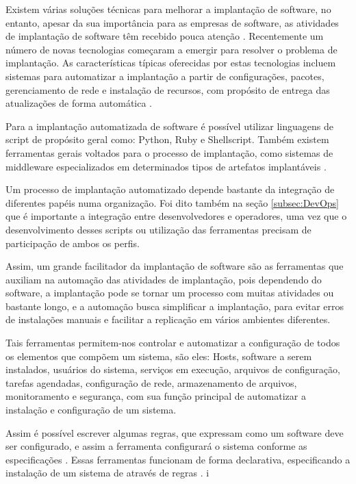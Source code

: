 Existem várias soluções técnicas para melhorar a implantação de software,
no entanto, apesar da sua importância para as empresas de software, as atividades
de implantação de software têm recebido pouca atenção \cite{5741269}. Recentemente 
um número de novas tecnologias começaram a emergir para
resolver o problema de implantação. As características típicas oferecidas por
estas tecnologias incluem sistemas para automatizar a implantação a partir de
configurações, pacotes, gerenciamento de rede e instalação de recursos, com
propósito de entrega das atualizações de forma automática \cite{deployment1998}.

Para a implantação automatizada de software é
possível utilizar linguagens de script de propósito
geral como: Python, Ruby e Shellscript. Também existem ferramentas gerais 
voltados para o processo de implantação, como sistemas de middleware 
especializados em determinados tipos de artefatos implantáveis \cite{leo2014}.

Um processo de implantação automatizado depende bastante da integração de diferentes papéis
numa organização. Foi dito também na seção \ref{subsec:DevOps} que é importante a
integração entre desenvolvedores e operadores, uma vez que o desenvolvimento desses
scripts ou utilização das ferramentas precisam de participação de ambos os perfis.

Assim, um grande facilitador da implantação de software são as ferramentas que auxiliam na
automação das atividades de implantação, pois dependendo do software, a implantação
pode se tornar um processo com muitas atividades ou bastante longo, e a automação
busca simplificar a implantação, para evitar erros de instalações manuais e 
facilitar a replicação em vários ambientes diferentes.

Tais ferramentas permitem-nos controlar e automatizar a configuração de todos os 
elementos que compõem um sistema, são eles: Hosts, software a serem instalados,
usuários do sistema, serviços em execução, arquivos de configuração, tarefas agendadas,
configuração de rede, armazenamento de arquivos, monitoramento e segurança, com 
sua função principal de automatizar a instalação e configuração de um 
sistema. 

Assim é possível escrever algumas regras, que expressam como um software deve 
ser configurado, e assim a ferramenta configurará o sistema conforme as 
especificações \cite{6265084}. Essas ferramentas funcionam de forma declarativa, 
especificando a instalação de um sistema de através de regras \cite{6265084}. i

